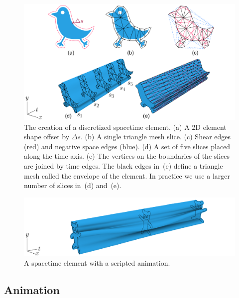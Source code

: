 \begin{figure}
\centering
\includegraphics[width=1.0\textwidth]{figures/animationpak/discretization.pdf} 
\caption[The creation of a discretized spacetime element]
{\label{fig_animationpak_discretization} 
The creation of a discretized spacetime element.  
(a) A 2D element shape offset by $\Delta s$.
(b) A single triangle mesh slice.
(c) Shear edges (red) and negative space edges (blue).
(d) A set of five slices placed along the time axis.
(e) The vertices on the boundaries of the slices are joined by 
  time edges.  The black edges in~(e) define a triangle mesh
  called the envelope of the element.
  In practice we use a larger number of slices in~(d) and~(e).
}
\end{figure}

\begin{figure}
\centering
\includegraphics[width=1.0\textwidth]{figures/animationpak/spacetime_element.pdf} 
\caption[A spacetime element with a scripted animation]
{\label{fig_animationpak_spacetime_element} 
A spacetime element with a scripted animation.}
\end{figure}


\subsection{Animation}
\label{animationpak_animation}


